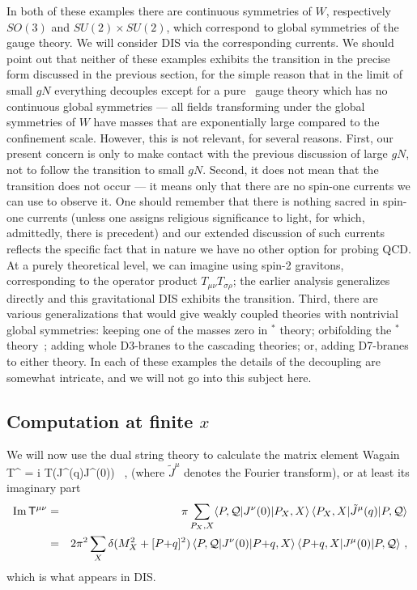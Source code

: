 In both of these examples there are continuous symmetries of $W$,
respectively $SO(3)$ and $SU(2) \times SU(2)$, which correspond
to global symmetries of the gauge theory.  We will consider DIS via the
corresponding currents.  We should point out that neither of these examples
exhibits the transition in the precise form discussed in the previous
section, for the simple reason that in the limit of small $gN$ everything
decouples except for a pure
\none\ gauge theory which has no continuous 
global symmetries --- all fields transforming
under the global symmetries of $W$ have masses that are exponentially large
compared to the confinement scale.
However, this is not relevant, for
several reasons.  First, our present concern is only to make
contact with the previous discussion of large $gN$, not to follow the
transition to small $gN$.  Second, it does not mean that the
transition does not occur --- it means only that there are no spin-one
currents we can use to observe it.  One should remember that there is
nothing sacred in spin-one currents (unless one assigns religious
significance to light, for which, admittedly, there is precedent)
and our extended discussion of such currents reflects the specific fact
that in nature we have no other option for probing QCD.  At
a purely theoretical level, we can imagine using spin-2 gravitons,
corresponding to the operator product $T_{\mu\nu} T_{\sigma\rho}$; the earlier
analysis generalizes directly and this gravitational DIS exhibits the
transition.  Third, there are various generalizations that would give weakly
coupled theories with nontrivial global symmetries: keeping one of the masses
zero in
\none$^*$ theory; orbifolding the \none$^*$ theory~\cite{PS};
adding whole D3-branes to the cascading theories; or, adding D7-branes to
either theory.  In each of these examples the details of the decoupling are
somewhat intricate, and we will not go into this subject here.


\subsection{Computation at finite $x$}

We will now use the dual string theory to calculate the matrix element
\bel
{Wagain}
{\sf T}^{\mu\nu} = i  T(\tilde J^\mu(q)J^\nu(0)) \ ,
\ee
(where $\tilde J^\mu$ denotes the Fourier transform),
or at least its imaginary part
\begin{eqnarray}
{\rm Im}\,{\sf T}^{\mu\nu} &=& \pi \sum_{{P}_X,X} \langle P,{\cal Q} |
J^\nu(0)
| P_X,X\rangle\,
\langle P_X,X | \tilde J^\mu(q) | P,{\cal Q}\rangle\nonumber\\
&=&
2 \pi^2 \sum_{X} \delta(M_X^2 + [P{+}q]^2)\,
\langle P,{\cal Q} | J^\nu(0) | P{+}q,X\rangle\,
\langle P{+}q,X | J^\mu(0) | P,{\cal Q}\rangle\ ,
\label{wim}
\end{eqnarray}
which is what appears in DIS.

